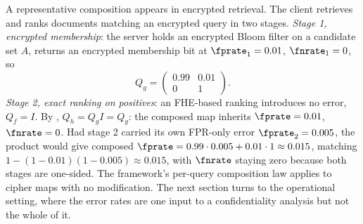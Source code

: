 A representative composition appears in encrypted retrieval. The client
retrieves and ranks documents matching an encrypted query in two stages.
\emph{Stage 1, encrypted membership}: the server holds an encrypted Bloom
filter on a candidate set $A$, returns an encrypted membership bit at
$\fprate_1 = 0.01$, $\fnrate_1 = 0$, so
\[
  Q_g = \begin{pmatrix} 0.99 & 0.01 \\ 0 & 1 \end{pmatrix}.
\]
\emph{Stage 2, exact ranking on positives}: an FHE-based ranking
introduces no error, $Q_f = I$. By , $Q_h =
Q_g I = Q_g$: the composed map inherits $\fprate = 0.01$, $\fnrate = 0$.
Had stage 2 carried its own FPR-only error $\fprate_2 = 0.005$, the
product would give composed $\fprate = 0.99 \cdot 0.005 + 0.01 \cdot 1
\approx 0.015$, matching $1 - (1 - 0.01)(1 - 0.005) \approx 0.015$, with
$\fnrate$ staying zero because both stages are one-sided. The framework's
per-query composition law applies to cipher maps with no modification.
The next section turns to the operational setting, where the error rates
are one input to a confidentiality analysis but not the whole of it.
